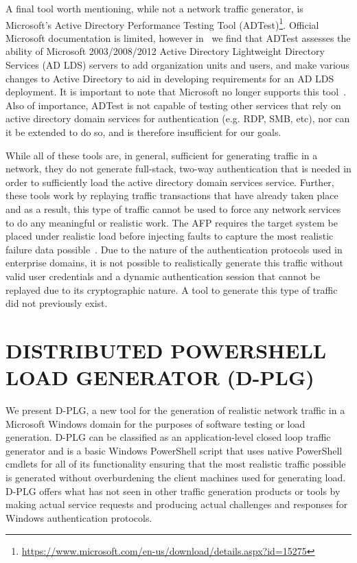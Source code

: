 A final tool worth mentioning, while not a network traffic generator, is
Microsoft's Active Directory Performance Testing Tool
(ADTest)\footnote{\url{https://www.microsoft.com/en-us/download/details.aspx?id=15275}}.
Official Microsoft documentation is limited, however
in~\cite{bijaoui2011,morowczynski2014,suyanto2010,suyanto2010_2} we find that
ADTest assesses the ability of Microsoft 2003/2008/2012 Active Directory
Lightweight Directory Services (AD LDS) servers to add organization units and
users, and make various changes to Active Directory to aid in developing
requirements for an AD LDS deployment.  It is important to note that Microsoft
no longer supports this tool~\cite{morowczynski2014}.  Also of importance,
ADTest is not capable of testing other services that rely on active directory
domain services for authentication (e.g. RDP, SMB, etc), nor can it be extended
to do so, and is therefore insufficient for our goals.

While all of these tools are, in general, sufficient for generating traffic in
a network, they do not generate full-stack, two-way authentication that is
needed in order to sufficiently load the active directory domain services
service.  Further, these tools work by replaying traffic transactions that have
already taken place and as a result, this type of traffic cannot be used to
force any network services to do any meaningful or realistic work.  The AFP
requires the target system be placed under realistic load before injecting
faults to capture the most realistic failure data
possible~\cite{irrera2014,irrera2015}.  Due to the nature of the authentication
protocols used in enterprise domains, it is not possible to realistically
generate this traffic without valid user credentials and a dynamic
authentication session that cannot be replayed due to its cryptographic nature.
A tool to generate this type of traffic did not previously exist.

\section{\uppercase{Distributed PowerShell Load Generator (D-PLG)}}
\label{sec:contrib} 
\noindent We present D-PLG, a new tool for the generation of realistic network
traffic in a Microsoft Windows domain for the purposes of software testing or
load generation.  D-PLG can be classified as an application-level closed loop
traffic generator and is a basic Windows PowerShell script that uses native
PowerShell cmdlets for all of its functionality ensuring that the most
realistic traffic possible is generated without overburdening the client
machines used for generating load.  D-PLG offers what has not seen in other
traffic generation products or tools by making actual service requests and
producing actual challenges and responses for Windows authentication protocols.

